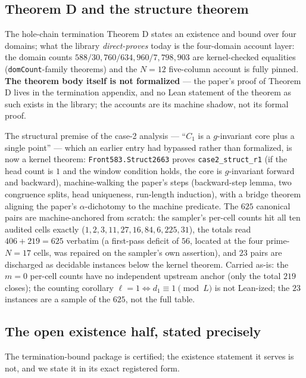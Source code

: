 \subsection{Theorem D and the structure theorem}\label{subsec:leanstruct}

The hole-chain termination Theorem D states an existence and bound over four domains; what
the library \emph{direct-proves} today is the four-domain account layer: the domain counts
$588/\allowbreak 30{,}760/\allowbreak 634{,}960/\allowbreak 7{,}798{,}903$ are kernel-checked equalities
(\texttt{domCount}-family theorems) and the $N{=}12$ five-column account is fully pinned.
\textbf{The theorem body itself is not formalized} --- the paper's proof of Theorem D
lives in the termination appendix, and no Lean statement of the theorem as such exists in
the library; the accounts are its machine shadow, not its formal proof.

The structural premise of the case-2 analysis --- ``$C_1$ is a $g$-invariant core plus a
single point'' --- which an earlier entry had bypassed rather than formalized, is now a
kernel theorem: \texttt{Front583.\allowbreak Struct2663} proves \texttt{case2\_struct\_r1} (if the
head count is $1$ and the window condition holds, the core is $g$-invariant forward and
backward), machine-walking the paper's steps (backward-step lemma, two congruence splits,
head uniqueness, run-length induction), with a bridge theorem aligning the paper's
$\alpha$-dichotomy to the machine predicate. The $625$ canonical pairs are
machine-anchored from scratch: the sampler's per-cell counts hit all ten audited cells
exactly ($1,2,3,11,27,16,84,6,225,31$), the totals read $406+219=625$ verbatim (a
first-pass deficit of $56$, located at the four prime-$N{=}17$ cells, was repaired on the
sampler's own assertion), and $23$ pairs are discharged as decidable instances below the
kernel theorem. Carried as-is: the $m=0$ per-cell counts have no independent upstream
anchor (only the total $219$ closes); the counting corollary
$\ell=1\iff d_1\equiv1\pmod L$ is not Lean-ized; the $23$ instances are a sample of the
$625$, not the full table.

\subsection{The open existence half, stated precisely}\label{subsec:leangapex}

The termination-bound package is certified; the existence statement it serves is not,
and we state it in its exact registered form.

